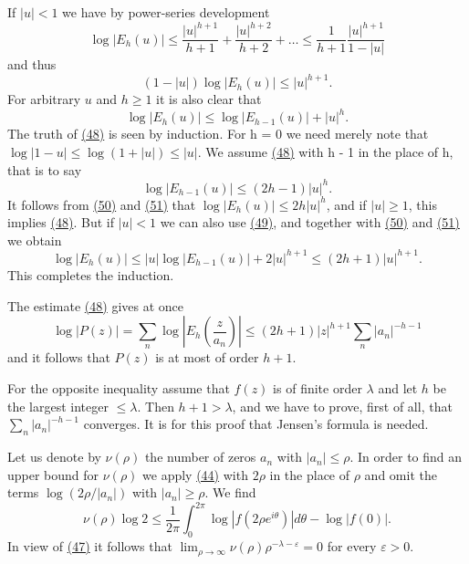 If $|u| < 1$ we have by power-series development
\begin{equation*}
\log | E _ {h} (u) | \leq \frac {| u | ^ {h + 1}}{h + 1} + \frac {| u | ^ {h + 2}}{h + 2} + \dots \leq \frac {1}{h + 1} \frac {| u | ^ {h + 1}}{1 - | u |}
\end{equation*}
and thus
\begin{equation*}
(1 - | u |) \log | E _ {h} (u) | \leq | u | ^ {h + 1}.\tag{49}\label{eq:5.49}
\end{equation*}
For arbitrary $u$ and $h \geq 1$ it is also clear that
\begin{equation*}
\log | E _ {h} (u) | \leq \log | E _ {h - 1} (u) | + | u | ^ {h}.\tag{50}\label{eq:5.50}
\end{equation*}
The truth of \hyperref[eq:5.48]{(48)} is seen by induction. For h = 0 we need merely note that $\log |1 - u| \leq \log (1 + |u|) \leq |u|$. We assume \hyperref[eq:5.48]{(48)} with h - 1 in the place of h, that is to say
\begin{equation*}
\log | E _ {h - 1} (u) | \leq (2 h - 1) | u | ^ {h}.\tag{51}\label{eq:5.51}
\end{equation*}
It follows from \hyperref[eq:5.50]{(50)} and \hyperref[eq:5.51]{(51)} that $\log |E_{h}(u)| \leq 2h|u|^{h}$, and if $|u| \geq 1$, this implies \hyperref[eq:5.48]{(48)}. But if $|u| < 1$ we can also use \hyperref[eq:5.49]{(49)}, and together with \hyperref[eq:5.50]{(50)} and \hyperref[eq:5.51]{(51)} we obtain
\begin{equation*}
\log | E _ {h} (u) | \leq | u | \log | E _ {h - 1} (u) | + 2 | u | ^ {h + 1} \leq (2 h + 1) | u | ^ {h + 1}.
\end{equation*}
This completes the induction.


The estimate \hyperref[eq:5.48]{(48)} gives at once
\begin{equation*}
\log | P (z) | = \sum_ {n} \log \left| E _ {h} \left(\frac {z}{a _ {n}}\right) \right| \leq (2 h + 1) | z | ^ {h + 1} \sum_ {n} | a _ {n} | ^ {- h - 1}
\end{equation*}
and it follows that $P(z)$ is at most of order $h + 1$.

For the opposite inequality assume that $f(z)$ is of finite order $\lambda$ and let $h$ be the largest integer $\leq \lambda$. Then $h + 1 > \lambda$, and we have to prove, first of all, that $\sum_{n} |a_n|^{-h-1}$ converges. It is for this proof that Jensen's formula is needed.

Let us denote by $\nu(\rho)$ the number of zeros $a_{n}$ with $|a_{n}|\leq\rho$. In order to find an upper bound for $\nu(\rho)$ we apply \hyperref[eq:5.44]{(44)} with $2\rho$ in the place of $\rho$ and omit the terms $\log(2\rho/|a_{n}|)$ with $|a_{n}|\geq\rho$. We find
\begin{equation*}
\nu (\rho) \log 2 \leq \frac {1}{2 \pi} \int_ {0} ^ {2 \pi} \log | f (2 \rho e ^ {i \theta}) | d \theta - \log | f (0) |.\tag{52}\label{eq:5.52}
\end{equation*}
In view of \hyperref[eq:5.47]{(47)} it follows that $\lim_{\rho \to \infty} \nu(\rho) \rho^{-\lambda - \varepsilon} = 0$ for every $\varepsilon > 0$.

